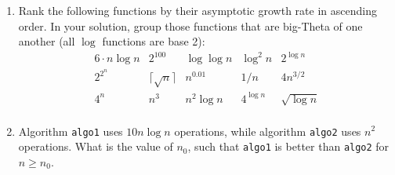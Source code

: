 \documentclass[11pt]{article}
\begin{document}
\begin{enumerate}[leftmargin=*]

    \item Rank the following functions by their asymptotic growth rate in ascending order.  In your solution, group those functions that are big-Theta of one another (all $\log$ functions are base 2):
    \begin{equation*}
        \begin{array}{ccccc}
            6 \cdot n\log n & 2^{100} & \log \log n & \log^2 n & 2^{\log n} \\
            2^{2^n} & \lceil\sqrt{n}\rceil & n^{0.01} & 1/n & 4n^{3/2} \\
            4^n & n^3 & n^2\log n & 4^{\log n} & \sqrt{\log n} \\
        \end{array}
    \end{equation*}

    \item Algorithm \verb|algo1| uses $10n\log n$ operations, while algorithm \verb|algo2| uses $n^2$ operations.  What is the value of $n_0$, such that \verb|algo1| is better than \verb|algo2| for $n\ge n_0$.


\end{enumerate}
\end{document}
